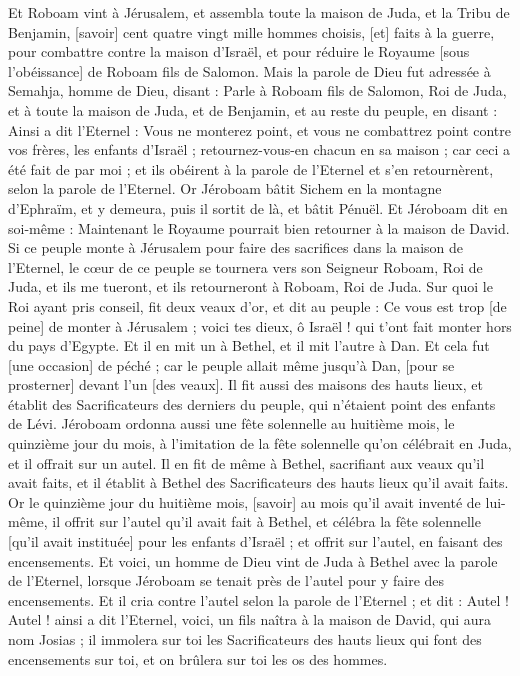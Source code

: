 \begin{multicols}{2}
Et Roboam vint à Jérusalem, et assembla toute la maison de Juda, et la Tribu de Benjamin, [savoir] cent quatre vingt mille hommes choisis, [et] faits à la guerre, pour combattre contre la maison d'Israël, et pour réduire le Royaume [sous l'obéissance] de Roboam fils de Salomon.
Mais la parole de Dieu fut adressée à Semahja, homme de Dieu, disant :
Parle à Roboam fils de Salomon, Roi de Juda, et à toute la maison de Juda, et de Benjamin, et au reste du peuple, en disant :
Ainsi a dit l'Eternel : Vous ne monterez point, et vous ne combattrez point contre vos frères, les enfants d'Israël ; retournez-vous-en chacun en sa maison ; car ceci a été fait de par moi ; et ils obéirent à la parole de l'Eternel et s'en retournèrent, selon la parole de l'Eternel.
Or Jéroboam bâtit Sichem en la montagne d'Ephraïm, et y demeura, puis il sortit de là, et bâtit Pénuël.
Et Jéroboam dit en soi-même : Maintenant le Royaume pourrait bien retourner à la maison de David.
Si ce peuple monte à Jérusalem pour faire des sacrifices dans la maison de l'Eternel, le cœur de ce peuple se tournera vers son Seigneur Roboam, Roi de Juda, et ils me tueront, et ils retourneront à Roboam, Roi de Juda.
Sur quoi le Roi ayant pris conseil, fit deux veaux d'or, et dit au peuple : Ce vous est trop [de peine] de monter à Jérusalem ; voici tes dieux, ô Israël ! qui t'ont fait monter hors du pays d'Egypte.
Et il en mit un à Bethel, et il mit l'autre à Dan.
Et cela fut [une occasion] de péché ; car le peuple allait même jusqu'à Dan, [pour se prosterner] devant l'un [des veaux].
Il fit aussi des maisons des hauts lieux, et établit des Sacrificateurs des derniers du peuple, qui n'étaient point des enfants de Lévi.
Jéroboam ordonna aussi une fête solennelle au huitième mois, le quinzième jour du mois, à l'imitation de la fête solennelle qu'on célébrait en Juda, et il offrait sur un autel. Il en fit de même à Bethel, sacrifiant aux veaux qu'il avait faits, et il établit à Bethel des Sacrificateurs des hauts lieux qu'il avait faits.
Or le quinzième jour du huitième mois, [savoir] au mois qu'il avait inventé de lui-même, il offrit sur l'autel qu'il avait fait à Bethel, et célébra la fête solennelle [qu'il avait instituée] pour les enfants d'Israël ; et offrit sur l'autel, en faisant des encensements.
\VerseOne{}Et voici, un homme de Dieu vint de Juda à Bethel avec la parole de l'Eternel, lorsque Jéroboam se tenait près de l'autel pour y faire des encensements.
Et il cria contre l'autel selon la parole de l'Eternel ; et dit : Autel ! Autel ! ainsi a dit l'Eternel, voici, un fils naîtra à la maison de David, qui aura nom Josias ; il immolera sur toi les Sacrificateurs des hauts lieux qui font des encensements sur toi, et on brûlera sur toi les os des hommes.

\end{multicols}
